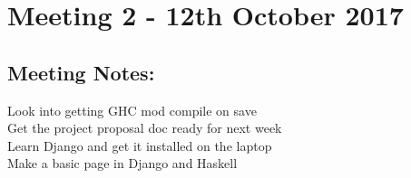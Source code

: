 \section{Meeting 2 - 12th October 2017}

\subsection{Meeting Notes:}

Look into getting GHC mod compile on save\\
Get the project proposal doc ready for next week\\
Learn Django and get it installed on the laptop\\
Make a basic page in Django and Haskell
